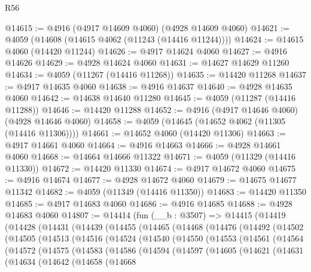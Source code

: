 \begin{lexlean}{R56}
\begin{coremodule}
@14615 := @4916 (@4917 @14609 @4060) (@4928 @14609 @4060)
@14621 := @4059 (@14608 (@14615 @4062 (@11243 (@14416 @11244))))
@14624 := @14615 @4060 (@14420 @11244)
@14626 := @4917 @14624 @4060
@14627 := @4916 @14626
@14629 := @4928 @14624 @4060
@14631 := @14627 @14629 @11260
@14634 := @4059 (@11267 (@14416 @11268))
@14635 := @14420 @11268
@14637 := @4917 @14635 @4060
@14638 := @4916 @14637
@14640 := @4928 @14635 @4060
@14642 := @14638 @14640 @11280
@14645 := @4059 (@11287 (@14416 @11288))
@14646 := @14420 @11288
@14652 := @4916 (@4917 @14646 @4060) (@4928 @14646 @4060)
@14658 := @4059 (@14645 (@14652 @4062 (@11305 (@14416 @11306))))
@14661 := @14652 @4060 (@14420 @11306)
@14663 := @4917 @14661 @4060
@14664 := @4916 @14663
@14666 := @4928 @14661 @4060
@14668 := @14664 @14666 @11322
@14671 := @4059 (@11329 (@14416 @11330))
@14672 := @14420 @11330
@14674 := @4917 @14672 @4060
@14675 := @4916 @14674
@14677 := @4928 @14672 @4060
@14679 := @14675 @14677 @11342
@14682 := @4059 (@11349 (@14416 @11350))
@14683 := @14420 @11350
@14685 := @4917 @14683 @4060
@14686 := @4916 @14685
@14688 := @4928 @14683 @4060
@14807 := @14414
    (fun (__b : @3507) =>
    @14415
      (@14419
        (@14428
          (@14431
            (@14439
              (@14455
                (@14465
                  (@14468
                    (@14476
                      (@14492
                        (@14502
                          (@14505
                            (@14513
                              (@14516
                                (@14524
                                  (@14540
                                    (@14550
                                      (@14553
                                        (@14561
                                          (@14564
                                            (@14572
                                              (@14575
                                                (@14583
                                                  (@14586
                                                    (@14594
                                                      (@14597
                                                        (@14605
                                                          (@14621
                                                            (@14631
                                                              (@14634
                                                                (@14642
                                                                  (@14658
                                                                    (@14668

\end{coremodule}
\end{lexlean}
